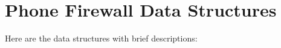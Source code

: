 \section{Phone Firewall Data Structures}
Here are the data structures with brief descriptions:\begin{CompactList}
\item{}
\end{CompactList}
